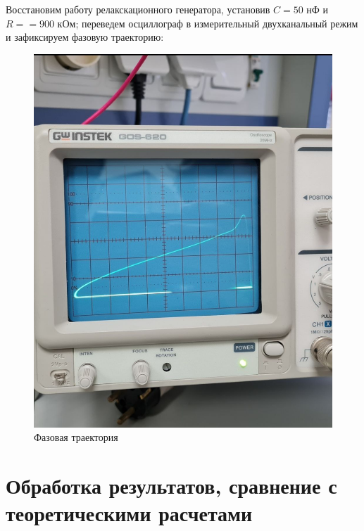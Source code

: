 \documentclass[a4paper,12pt]{article} %
\begin{document}
Восстановим работу релакскационного генератора, установив $C = 50 $ нФ и $R = 
 = 900 $ кОм; переведем осциллограф в измерительный двухканальный режим и зафиксируем фазовую траекторию:

\begin{figure}[H]
    \centering
    \includegraphics[scale=0.3]{fasa.png}
    \caption{Фазовая траектория}
    \label{tc}
\end{figure}


\section{Обработка результатов, сравнение с теоретическими расчетами}
\end{document}
